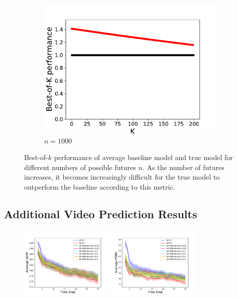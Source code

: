 \documentclass{article}
\begin{document}
\begin{figure}
  \begin{subfigure}[b]{0.3\textwidth}
    \includegraphics[width=\textwidth]{images/best_of_k_toy_n1000.pdf}
    \caption{$n=1000$}
    \label{fig:mouse}
  \end{subfigure}
  \caption{Best-of-$k$ performance of average baseline model and true model for different numbers of possible futures $n$. As the number of futures increases, it becomes increasingly difficult for the true model to outperform the baseline according to this metric.}\label{expected-loss}
  \end{figure}




\subsection{Additional Video Prediction Results}

\begin{figure}
  \centering
  \includegraphics[width=0.4\textwidth]{images/bair_ae_comparison_ssim.pdf}
  \includegraphics[width=0.4\textwidth]{images/bair_ae_comparison_psnr.pdf}
  \caption{}
  \label{bair}
\end{figure}
\end{document}
